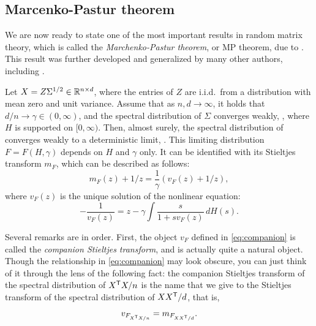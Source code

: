\documentclass{article}
\begin{document}
\subsection{Marcenko-Pastur theorem}

We are now ready to state one of the most important results in random matrix
theory, which is called the \emph{Marchenko-Pastur theorem}, or MP theorem, due
to \citet{marchenko1967distribution}. This result was further developed and
generalized by many other authors, including \citet{silverstein1995strong}.   

\begin{theorem}
\label{thm:mp}
Let $X = Z \Sigma^{1/2} \in \mathbb{R}^{n \times d}$, where the entries of $Z$ are
i.i.d.\ from a distribution with mean zero and unit variance. Assume that as
$n,d \to \infty$, it holds that $d/n \to \gamma \in (0,\infty)$, and the
spectral distribution of $\Sigma$ converges weakly, ,
where $H$ is supported on $[0,\infty)$. Then, almost surely, the spectral
distribution of  converges weakly to a deterministic
limit, . This limiting distribution $F = F(H,
\gamma)$ depends on $H$ and $\gamma$ only. It can be identified with its
Stieltjes transform $m_F$, which can be described as follows:
\begin{equation}
\label{eq:companion}
m_F(z) + 1/z = \frac{1}{\gamma}(v_F(z) + 1/z),
\end{equation} 
where $v_F(z)$ is the unique solution of the nonlinear equation:
\begin{equation}
\label{eq:silverstein}
-\frac{1}{v_F(z)} = z - \gamma \int \frac{s}{1 + sv_F(z)} \, dH(s).
\end{equation}
\end{theorem}

Several remarks are in order. First, the object $v_F$ defined in
\eqref{eq:companion} is called the \emph{companion Stieltjes transform}, and is
actually quite a natural object. Though the relationship in \eqref{eq:companion}
may look obscure, you can just think of it through the lens of the following
fact: the companion Stieltjes transform of the spectral distribution of $X^{\mathsf{T}} 
X/n$ is the name that we give to the Stieltjes transform of the spectral
distribution of $XX^{\mathsf{T}}/d$, that is,  
\[
v_{F_{X^{\mathsf{T}} X/n}} = m_{F_{XX^{\mathsf{T}}/d}}.
\]
\end{document}
